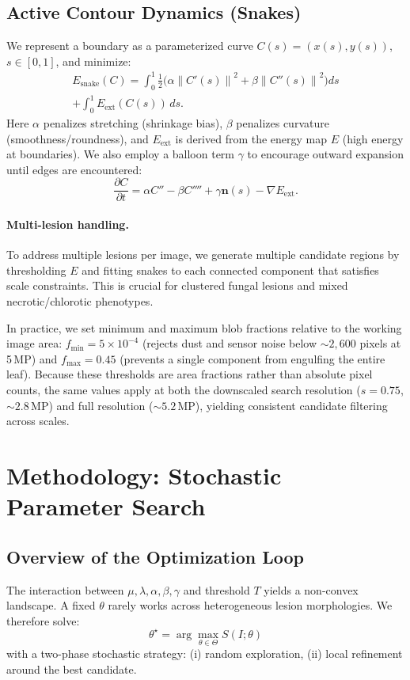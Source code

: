 \documentclass[11pt,a4paper]{article}
\newcommand{\grad}{\nabla}
\newcommand{\norm}[1]{\left\lVert #1 \right\rVert}
\begin{document}
\subsection{Active Contour Dynamics (Snakes)}
We represent a boundary as a parameterized curve $C(s) = (x(s), y(s))$, $s\in[0,1]$, and minimize:
\begin{multline}
E_{\mathrm{snake}}(C) = \int_0^1 \tfrac{1}{2}\Big(\alpha \norm{C'(s)}^2 + \beta \norm{C''(s)}^2\Big)ds \\
 + \int_0^1 E_{\mathrm{ext}}(C(s))\,ds.
\end{multline}
Here $\alpha$ penalizes stretching (shrinkage bias), $\beta$ penalizes curvature (smoothness/roundness), and $E_{\mathrm{ext}}$ is derived from the energy map $E$ (high energy at boundaries). We also employ a balloon term $\gamma$ to encourage outward expansion until edges are encountered:
\begin{equation}
\frac{\partial C}{\partial t} = \alpha C'' - \beta C'''' + \gamma \mathbf{n}(s) - \grad E_{\mathrm{ext}}.
\end{equation}

\paragraph{Multi-lesion handling.}
To address multiple lesions per image, we generate multiple candidate regions by thresholding $E$ and fitting snakes to each connected component that satisfies scale constraints. This is crucial for clustered fungal lesions and mixed necrotic/chlorotic phenotypes.

In practice, we set minimum and maximum blob fractions relative to the working image area: $f_{\min}=5\times10^{-4}$ (rejects dust and sensor noise below ${\sim}2{,}600$ pixels at 5\,MP) and $f_{\max}=0.45$ (prevents a single component from engulfing the entire leaf). Because these thresholds are area fractions rather than absolute pixel counts, the same values apply at both the downscaled search resolution ($s{=}0.75$, ${\sim}2.8$\,MP) and full resolution (${\sim}5.2$\,MP), yielding consistent candidate filtering across scales.

\section{Methodology: Stochastic Parameter Search}

\subsection{Overview of the Optimization Loop}
The interaction between $\mu,\lambda,\alpha,\beta,\gamma$ and threshold $T$ yields a non-convex landscape. A fixed $\theta$ rarely works across heterogeneous lesion morphologies. We therefore solve:
\begin{equation}
\theta^\star = \arg\max_{\theta\in\Theta} S(I;\theta)
\end{equation}
with a two-phase stochastic strategy: (i) random exploration, (ii) local refinement around the best candidate.
\end{document}
